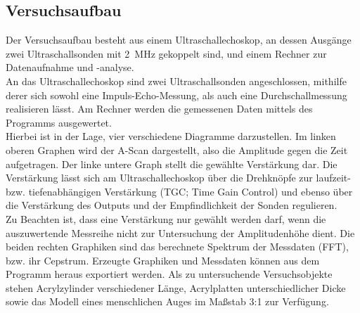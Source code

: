 \subsection{Versuchsaufbau}
\label{sec:Versuchsaufbau}
Der Versuchsaufbau besteht aus einem Ultraschallechoskop, an dessen Ausgänge zwei Ultraschallsonden mit \SI{2}{\mega\Hz} gekoppelt sind, und einem Rechner zur Datenaufnahme und -analyse.\\
An das Ultraschallechoskop sind zwei Ultraschallsonden angeschlossen, mithilfe derer sich sowohl eine Impuls-Echo-Messung, als auch eine Durchschallmessung realisieren lässt.
Am Rechner werden die gemessenen Daten mittels des Programms  ausgewertet.\\
Hierbei ist  in der Lage, vier verschiedene Diagramme darzustellen.
Im linken oberen Graphen wird der A-Scan dargestellt, also die Amplitude gegen die Zeit aufgetragen.
Der linke untere Graph stellt die gewählte Verstärkung dar. Die Verstärkung lässt sich am Ultraschallechoskop über die Drehknöpfe zur laufzeit-bzw. tiefenabhängigen Verstärkung (TGC; Time Gain Control) und ebenso über die Verstärkung des Outputs und der Empfindlichkeit der Sonden regulieren.\\
Zu Beachten ist, dass eine Verstärkung nur gewählt werden darf, wenn die auszuwertende Messreihe nicht zur Untersuchung der Amplitudenhöhe dient.
Die beiden rechten Graphiken sind das berechnete Spektrum der Messdaten (FFT), bzw. ihr
Cepstrum.
Erzeugte Graphiken und Messdaten können aus dem Programm heraus exportiert werden.
Als zu untersuchende Versuchsobjekte stehen Acrylzylinder verschiedener Länge, Acrylplatten unterschiedlicher Dicke sowie das Modell eines menschlichen Auges im Maßstab 3:1 zur Verfügung.
